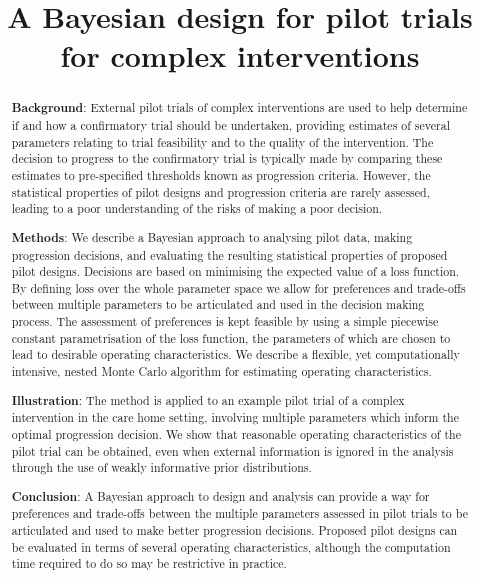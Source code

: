 \documentclass{article} %
\title{A Bayesian design for pilot trials for complex interventions}
\begin{document}
\maketitle

\begin{abstract}

\noindent\textbf{Background}: External pilot trials of complex interventions are used to help determine if and how a confirmatory trial should be undertaken, providing estimates of several parameters relating to trial feasibility and to the quality of the intervention. The decision to progress to the confirmatory trial is typically made by comparing these estimates to pre-specified thresholds known as progression criteria. However, the statistical properties of pilot designs and progression criteria are rarely assessed, leading to a poor understanding of the risks of making a poor decision. 

\noindent\textbf{Methods}: We describe a Bayesian approach to analysing pilot data, making progression decisions, and evaluating the resulting statistical properties of proposed pilot designs. Decisions are based on minimising the expected value of a loss function. By defining loss over the whole parameter space we allow for preferences and trade-offs between multiple parameters to be articulated and used in the decision making process. The assessment of preferences is kept feasible by using a simple piecewise constant parametrisation of the loss function, the parameters of which are chosen to lead to desirable operating characteristics. We describe a flexible, yet computationally intensive, nested Monte Carlo algorithm for estimating operating characteristics.

\noindent\textbf{Illustration}: The method is applied to an example pilot trial of a complex intervention in the care home setting, involving multiple parameters which inform the optimal progression decision. We show that reasonable operating characteristics of the pilot trial can be obtained, even when external information is ignored in the analysis through the use of weakly informative prior distributions. 

\noindent\textbf{Conclusion}: A Bayesian approach to design and analysis can provide a way for preferences and trade-offs between the multiple parameters assessed in pilot trials to be articulated and used to make better progression decisions. Proposed pilot designs can be evaluated in terms of several operating characteristics, although the computation time required to do so may be restrictive in practice.

\end{abstract}
\end{document}
